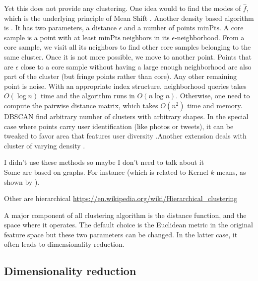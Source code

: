 Yet this does not provide any clustering. One idea would to find the modes of $\hat{f}$, which is the underlying principle of Mean Shift \autocite{MeanShift95}. Another density based algorithm is  \autocite{DBSCAN96}. It has two parameters, a distance $\epsilon$ and a number of points $\mathrm{minPts}$. A core sample is a point with at least $\mathrm{minPts}$ neighbors in its $\epsilon$-neighborhood. From a core sample, we visit all its neighbors to find other core samples belonging to the same cluster. Once it is not more possible, we move to another point. Points that are $\epsilon$ close to a core sample without having a large enough neighborhood are also part of the cluster (but fringe points rather than core). Any other remaining point is noise. With an appropriate index structure, neighborhood queries takes $O(\log n)$ time and the algorithm runs in $O(n\log n)$. Otherwise, one need to compute the pairwise distance matrix, which takes $O(n^2)$ time and memory. DBSCAN find arbitrary number of clusters with arbitrary shapes. In the special case where points carry user identification (like photos or tweets), it can be tweaked to favor area that features user diversity \autocite{PDBSCANKisilevich2010}.Another extension deals with cluster of varying density \autocite{OPTICS99}.

\begin{comments}
I didn't use these methods so maybe I don't need to talk about it\\
Some are based on graphs. For instance  \autocite{SpectralClustering01} (which is related to Kernel $k$-means, as shown by \textcite{KernelKmeans04}).
 \autocite{AffinityPropagation07}

Other are hierarchical
\url{https://en.wikipedia.org/wiki/Hierarchical_clustering}
\end{comments}

A major component of all clustering algorithm is the distance function, and the space where it operates. The default choice is the Euclidean metric in the original feature space but these two parameters can be changed. In the latter case, it often leads to dimensionality reduction.

\subsection{Dimensionality reduction}

